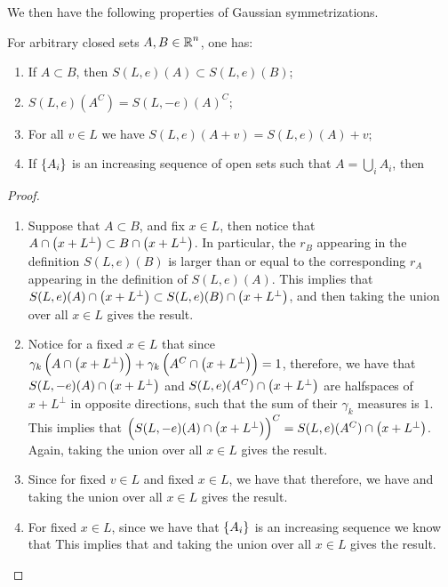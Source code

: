 \documentclass[../main.tex]{subfiles}
\begin{document}
We then have the following properties of Gaussian symmetrizations.
\begin{proposition}
\label{prop:Gauss_symm_properties}
For arbitrary closed sets $A,B\in\operatorname{\mathbb{R}}^n$, one has:
\begin{enumerate}
    \item If $A\subset B$, then $S(L,e)(A)\subset S(L,e)(B)$;
    \item $S(L,e)(A^C) = S(L,-e)(A)^C$;
    \item For all $v\in L$ we have $S(L,e)(A+v) = S(L,e)(A)+v$;
    \item If $\cbr{A_i}$ is an increasing sequence of open sets such that $A = \bigcup_i A_i$, then 
\end{enumerate}
\end{proposition}
\begin{proof}
\begin{enumerate}
    \item Suppose that $A\subset B$, and fix $x\in L$, then notice that $A\cap\del{x + L^\perp}\subset B\cap\del{x + L^\perp}$. In particular, the $r_B$ appearing in the definition $S(L,e)(B)$ is larger than or equal to the corresponding $r_A$ appearing in the definition of $S(L,e)(A)$. This implies that $S(L,e)(A)\cap\del{x + L^\perp}\subset S(L,e)(B)\cap\del{x + L^\perp}$, and then taking the union over all $x\in L$ gives the result.
    \item Notice for a fixed $x\in L$ that since $\gamma_k\del{A\cap\del{x + L^\perp}} + \gamma_k\del{A^C\cap\del{x + L^\perp}} = 1$, therefore, we have that $S(L,-e)(A)\cap\del{x + L^\perp}$ and $S(L,e)(A^C)\cap\del{x + L^\perp}$ are halfspaces of $x + L^\perp$ in opposite directions, such that the sum of their $\gamma_k$ measures is $1$. This implies that $\del{S(L,-e)(A)\cap\del{x + L^\perp}}^C = S(L,e)(A^C)\cap\del{x + L^\perp}$. Again, taking the union over all $x\in L$ gives the result.
    \item Since for fixed $v\in L$ and fixed $x\in L$, we have that  therefore, we have  and taking the union over all $x\in L$ gives the result.
    \item For fixed $x\in L$, since we have that $\cbr{A_i}$ is an increasing sequence we know that  This implies that  and taking the union over all $x\in L$ gives the result.
\end{enumerate}
\end{proof}
\end{document}
